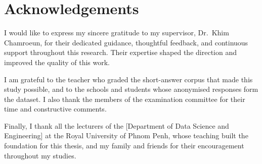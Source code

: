 \chapter*{Acknowledgements}

I would like to express my sincere gratitude to my supervisor, Dr.\ Khim Chamroeun, for their
dedicated guidance, thoughtful feedback, and continuous support throughout this research. Their
expertise shaped the direction and improved the quality of this work.

I am grateful to the teacher who graded the short-answer corpus that made this study possible, and
to the schools and students whose anonymised responses form the dataset. I also thank the members
of the examination committee for their time and constructive comments.

Finally, I thank all the lecturers of the [Department of Data Science and Engineering] at the Royal
University of Phnom Penh, whose teaching built the foundation for this thesis, and my family and
friends for their encouragement throughout my studies.
\clearpage
